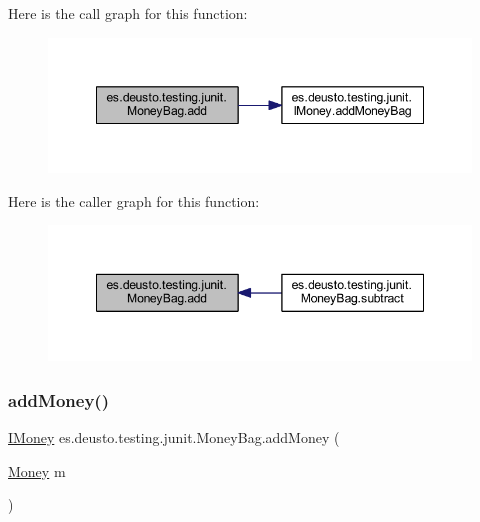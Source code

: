 Here is the call graph for this function\+:\nopagebreak
\begin{figure}[H]
\begin{center}
\leavevmode
\includegraphics[width=348pt]{classes_1_1deusto_1_1testing_1_1junit_1_1_money_bag_ab3be83ff12fa6d19b67b669194120d00_cgraph}
\end{center}
\end{figure}
Here is the caller graph for this function\+:\nopagebreak
\begin{figure}[H]
\begin{center}
\leavevmode
\includegraphics[width=348pt]{classes_1_1deusto_1_1testing_1_1junit_1_1_money_bag_ab3be83ff12fa6d19b67b669194120d00_icgraph}
\end{center}
\end{figure}
\mbox{\label{classes_1_1deusto_1_1testing_1_1junit_1_1_money_bag_a06ecedbf53ba09d34276fe177e3169bc}} 
\subsubsection{\texorpdfstring{add\+Money()}{addMoney()}}
{\footnotesize\ttfamily \mbox{\hyperlink{interfacees_1_1deusto_1_1testing_1_1junit_1_1_i_money}{I\+Money}} es.\+deusto.\+testing.\+junit.\+Money\+Bag.\+add\+Money (\begin{DoxyParamCaption}\item[{\mbox{\hyperlink{classes_1_1deusto_1_1testing_1_1junit_1_1_money}{Money}}}]{m }\end{DoxyParamCaption})}

